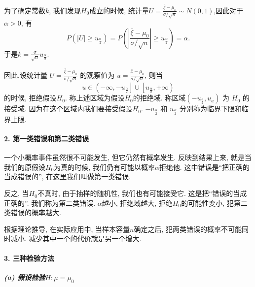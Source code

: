 为了确定常数$k$, 我们发现$H_0$成立的时候, 统计量$U=\frac{\bar{\xi}-\mu_0}{\sigma / \sqrt{n}} \sim N(0,1)$,因此对于$\alpha>0$, 有$$P\left(|U| \geqslant u_{\frac{\alpha}{2}}\right)=P\left(\left|\frac{\bar{\xi}-\mu_0}{\sigma / \sqrt{n}}\right| \geqslant u_{\frac{\alpha}{2}}\right)=\alpha.$$于是$k=\frac{\sigma}{\sqrt{n}} u_{\frac{\alpha}{2}}$.

因此,设统计量 $U=\frac{\bar{\xi}-\mu_0}{\sigma / \sqrt{n}}$ 的观察值为 $u=\frac{\bar{x}-\mu_0}{\sigma / \sqrt{n}}$, 则当$$u \in\left(-\infty,-u_{\frac{\alpha}{2}}\right] \cup\left[u_{\frac{\alpha}{2}},+\infty\right)$$的时候, 拒绝假设$H_0$. 称上述区域为假设$H_0$的拒绝域. 称区域$\left(-u_{ \frac{a}{2}}, u_a\right)$ 为 $H_0$ 的接受域. 因为在这个区域内我们要接受假设$H_0$. $-u_{\frac{\alpha}{2}}$ 和 $u_{\frac{\alpha}{2}}$ 分别称为临界下限和临界上限.

\paragraph{2. 第一类错误和第二类错误}一个小概率事件虽然很不可能发生, 但它仍然有概率发生. 反映到结果上来, 就是当我们的原假设$H_0$为真的时候, 我们仍有可能以概率$\alpha$拒绝他. 这中错误是``把正确的当成错误的'', 在这里我们叫做第一类错误. 

反之, 当$H_0$不真时, 由于抽样的随机性, 我们也有可能接受它. 这是把``错误的当成正确的''. 我们称为第二类错误. $\alpha$越小, 拒绝域越大, 拒绝$H_0$的可能性变小, 犯第二类错误的概率越大. 

根据理论推导, 在实际应用中, 当样本容量$n$确定之后, 犯两类错误的概率不可能同时减小. 减少其中一个的代价就是另一个增大. 

\paragraph{3. 三种检验方法}

\subparagraph{(a) 假设检验$H:\mu=\mu_0$} 

